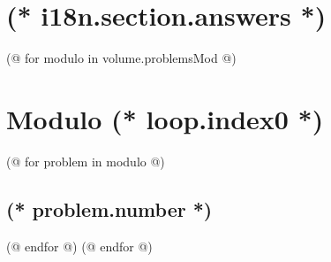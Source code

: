 \documentclass[12pt, twoside]{article}
\newcounter{volume}
\newcounter{problem}
\begin{document}
            
    \pagestyle{main}
    \thispagestyle{first}
    \vspace*{2em}
   
    \section{(* i18n.section.answers *)}
    \pagestyle{answers}
    (@ for modulo in volume.problemsMod @)
        \newpage%
        \section{Modulo (* loop.index0 *)}
        (@ for problem in modulo @)%
            \setcounter{volume}{(* volume.number *)}%
            \setcounter{problem}{(* problem.number *)}%
            \subsection{(* problem.number *)}%
        (@ endfor @)
    (@ endfor @)
\end{document}
